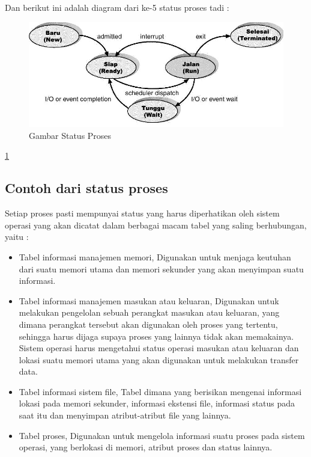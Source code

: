 	Dan berikut ini adalah diagram dari ke-5 status proses tadi :
	
	\begin{figure} [ht]
	\centerline{\includegraphics[width=1\textwidth]{figures/statusproses.jpg}}
	\caption{Gambar Status Proses}
	\label{statusproses}
	\end{figure}
	
	\ref{statusproses}
	
	\subsection{Contoh dari status proses}
	Setiap proses pasti mempunyai status yang harus diperhatikan oleh sistem operasi yang akan dicatat dalam berbagai macam tabel yang saling berhubungan, yaitu :
		\begin{itemize}
			\item Tabel informasi manajemen memori, Digunakan untuk menjaga keutuhan dari suatu memori utama dan memori sekunder yang akan menyimpan suatu informasi.
			\item Tabel informasi manajemen masukan atau keluaran, Digunakan untuk melakukan pengelolan sebuah perangkat masukan atau keluaran, yang dimana perangkat tersebut akan digunakan oleh proses yang tertentu, sehingga harus dijaga supaya proses yang lainnya tidak akan memakainya. Sistem operasi harus mengetahui status operasi masukan atau keluaran dan lokasi suatu memori utama yang akan digunakan untuk melakukan transfer data.
			\item Tabel informasi sistem file, Tabel dimana yang berisikan mengenai informasi lokasi pada memori sekunder, informasi ekstensi file, informasi status pada saat itu dan menyimpan atribut-atribut file yang lainnya.
			\item Tabel proses, Digunakan untuk mengelola informasi suatu proses pada sistem operasi, yang berlokasi di memori, atribut proses dan status lainnya.
		\end{itemize}
	
